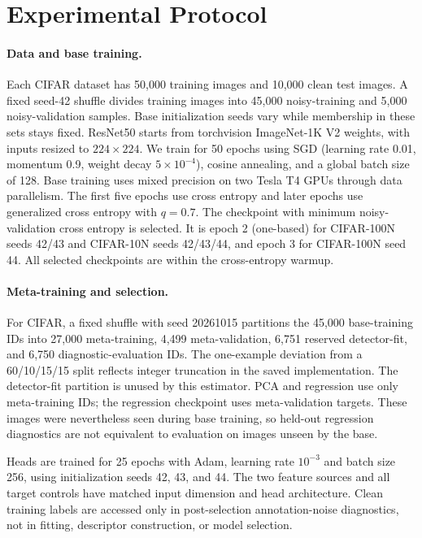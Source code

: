 \section{Experimental Protocol}
\label{sec:protocol}
\paragraph{Data and base training.}
Each CIFAR dataset has 50,000 training images and 10,000 clean test images. A fixed seed-42 shuffle divides training images into 45,000 noisy-training and 5,000 noisy-validation samples. Base initialization seeds vary while membership in these sets stays fixed. ResNet50 starts from torchvision ImageNet-1K V2 weights, with inputs resized to $224\times224$. We train for 50 epochs using SGD (learning rate 0.01, momentum 0.9, weight decay $5\times10^{-4}$), cosine annealing, and a global batch size of 128. Base training uses mixed precision on two Tesla T4 GPUs through data parallelism. The first five epochs use cross entropy and later epochs use generalized cross entropy with $q=0.7$. The checkpoint with minimum noisy-validation cross entropy is selected. It is epoch 2 (one-based) for CIFAR-100N seeds 42/43 and CIFAR-10N seeds 42/43/44, and epoch 3 for CIFAR-100N seed 44. All selected checkpoints are within the cross-entropy warmup.

\paragraph{Meta-training and selection.}
For CIFAR, a fixed shuffle with seed 20261015 partitions the 45,000 base-training IDs into 27,000 meta-training, 4,499 meta-validation, 6,751 reserved detector-fit, and 6,750 diagnostic-evaluation IDs. The one-example deviation from a 60/10/15/15 split reflects integer truncation in the saved implementation. The detector-fit partition is unused by this estimator. PCA and regression use only meta-training IDs; the regression checkpoint uses meta-validation targets. These images were nevertheless seen during base training, so held-out regression diagnostics are not equivalent to evaluation on images unseen by the base.

Heads are trained for 25 epochs with Adam, learning rate $10^{-3}$ and batch size 256, using initialization seeds 42, 43, and 44. The two feature sources and all target controls have matched input dimension and head architecture. Clean training labels are accessed only in post-selection annotation-noise diagnostics, not in fitting, descriptor construction, or model selection.

